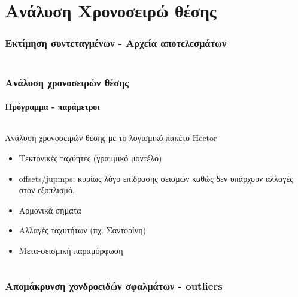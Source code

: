 \section{Ανάλυση Χρονοσειρώ θέσης}
 
\graphicspath{{Chapter2/Figs/}}

\begin{frame}
  \frametitle{Εκτίμηση συντεταγμένων - Αρχεία αποτελεσμάτων}
  \framesubtitle{}
  \label{}
  \begin{columns}[T]
    \begin{column}{.5\textwidth}
       
    \end{column}
    \begin{column}{.5\textwidth}
      
    \end{column}
  \end{columns}
\end{frame}
\note{}

\begin{frame}
  \frametitle{Ανάλυση χρονοσειρών θέσης}
  \framesubtitle{Πρόγραμμα - παράμετροι}
  \label{}
  \begin{columns}[T]
    \begin{column}{.5\textwidth}
      Ανάλυση χρονοσειρών θέσης με το λογισμικό πακέτο Hector \citep{Bos2012}
      \begin{itemize}\setlength\itemsep{1em}
        \item Τεκτονικές ταχύητες (γραμμικό μοντέλο)
        \item offsets/jupmps: κυρίως λόγο επίδρασης σεισμών καθώς δεν υπάρχουν αλλαγές στον εξοπλισμό.
        \item Αρμονικά σήματα
        \item Αλλαγές ταχυτήτων (πχ. Σαντορίνη)
        \item Μετα-σεισμική παραμόρφωση
      \end{itemize}
    \end{column}
    \begin{column}{.5\textwidth}
      
    \end{column}
  \end{columns}
\end{frame}
\note{}


\begin{frame}
  \frametitle{Απομάκρυνση χονδροειδών σφαλμάτων - outliers}
  \framesubtitle{}
  \label{}
  
\end{frame}
\note{}

